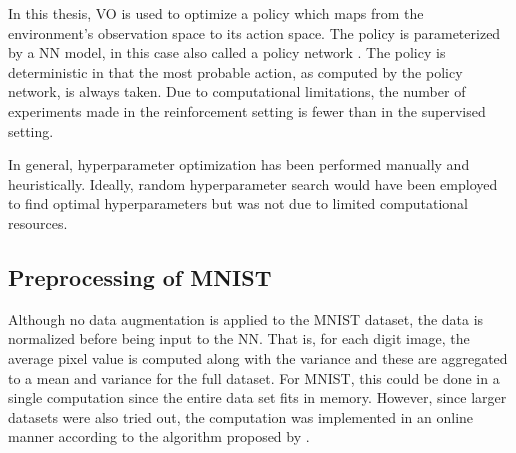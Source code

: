 In this thesis, \gls{VO} is used to optimize a policy which maps from the environment's observation space to its action space. The policy is parameterized by a \gls{NN} model, in this case also called a policy network \cite{Silver2014}. The policy is deterministic in that the most probable action, as computed by the policy network, is always taken. Due to computational limitations, the number of experiments made in the reinforcement setting is fewer than in the supervised setting.

In general, hyperparameter optimization has been performed manually and heuristically. Ideally, random hyperparameter search \cite{Bergstra2012a} would have been employed to find optimal hyperparameters but was not due to limited computational resources.


\subsection{Preprocessing of MNIST}
Although no data augmentation is applied to the \gls{MNIST} dataset, the data is normalized before being input to the \gls{NN}. That is, for each digit image, the average pixel value is computed along with the variance and these are aggregated to a mean and variance for the full dataset. For \gls{MNIST}, this could be done in a single computation since the entire data set fits in memory. However, since larger datasets were also tried out, the computation was implemented in an online manner according to the algorithm proposed by \cite{Welford1962}. 

